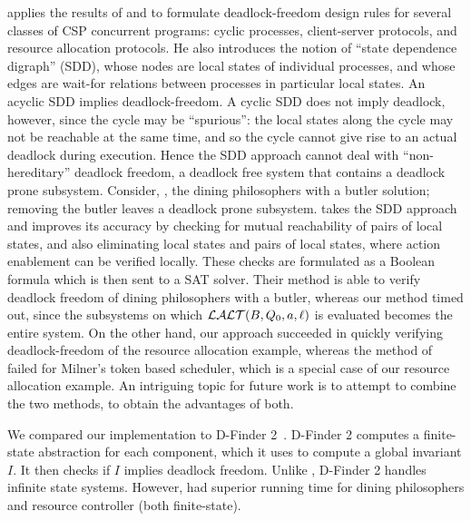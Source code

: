  applies the results of  and  to formulate deadlock-freedom design rules for several classes of CSP concurrent
programs: cyclic processes, client-server protocols, and resource allocation protocols. He also introduces the notion of ``state dependence digraph''
(SDD), whose nodes are local states of individual processes, and whose edges are wait-for relations between processes in particular local states. An
acyclic SDD implies deadlock-freedom. A cyclic SDD does not imply deadlock, however, since the cycle may be ``spurious'': the local states along the
cycle may not be reachable at the same time, and so the cycle cannot give rise to an actual deadlock during execution. Hence the SDD approach cannot
deal with ``non-hereditary'' deadlock freedom, \ie a deadlock free system that contains a deadlock prone subsystem. Consider, \eg, the dining
philosophers with a butler solution; removing the butler leaves a deadlock prone subsystem.
%
takes the SDD approach and improves its accuracy by checking for mutual reachability of pairs of local states, and also
eliminating local states and pairs of local states, where action enablement can be verified locally.
These checks are formulated as a Boolean formula which is then sent to
a SAT solver. Their method is able to verify deadlock freedom of
dining philosophers with a butler, whereas our method timed out, %
since the subsystems on which $\mathcal{LALT}(B, Q_0, a, \ell)$ is evaluated becomes the entire system.
On the other hand, our approach succeeded in quickly verifying deadlock-freedom of the resource
allocation example, whereas the method of 
failed for Milner's token based scheduler, which is a special
case of our resource allocation example.
%
An intriguing topic for future work is to attempt to combine the two methods, to obtain the
advantages of both.



We compared our implementation \deadlocktool to D-Finder 2~\cite{DFinder2}. D-Finder 2
computes a finite-state abstraction for each component, which it uses
to compute a global invariant $I$. It then checks if $I$ 
implies deadlock freedom.  Unlike \deadlocktool, D-Finder 2 
handles infinite state systems.
However, \deadlocktool had superior running time for
dining philosophers and resource controller (both finite-state).


